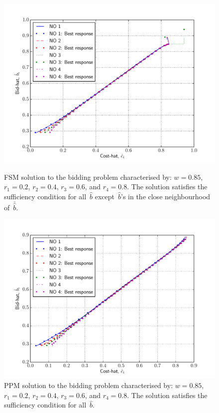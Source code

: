 \begin{figure}[p!]
  \includegraphics[width=\figsize]{Indirect/Figures/forward_shooting_4_sufficiency}
  \caption{FSM solution to the bidding problem characterised by: $w=0.85$, $r_1 = 0.2$, $r_2 = 0.4$, $r_3 = 0.6$, and $r_4=0.8$. The solution satisfies the sufficiency condition for all~$\hat{b}$ except~$\hat{b}$'s in the close neighbourhood of~$\bar{\hat{b}}$.}
  \label{fig:forward_shooting_4_sufficiency_indirect}
  \vspace{10mm}
  \includegraphics[width=\figsize]{Indirect/Figures/polynomial_projection_4_sufficiency}
  \caption{PPM solution to the bidding problem characterised by: $w=0.85$, $r_1 = 0.2$, $r_2 = 0.4$, $r_3 = 0.6$, and $r_4=0.8$. The solution satisfies the sufficiency condition for all~$\hat{b}$.}
  \label{fig:polynomial_projection_4_sufficiency_indirect}
\end{figure}

